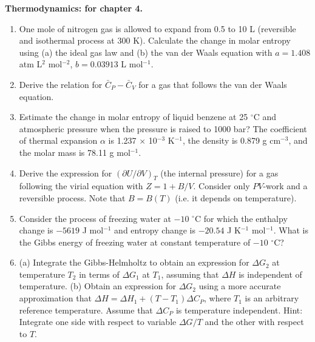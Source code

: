 \noindent
\textbf{Thermodynamics:
 for chapter 4.}\\

\begin{enumerate}

\item One mole of nitrogen gas is allowed to expand from 0.5 to 10 L (reversible and isothermal process at 300 K). Calculate the change in molar entropy using (a) the ideal
gas law and (b) the van der Waals equation with $a = 1.408$ atm L$^2$ mol$^{-2}$, $b = 0.03913$ L mol$^{-1}$.


\item Derive the relation for $\bar{C}_P - \bar{C}_V$ for a gas that follows the van der Waals equation.


\item Estimate the change in molar entropy of liquid benzene at 25 $^\circ$C and atmospheric pressure when the pressure is raised to 1000 bar? The coefficient of thermal expansion $\alpha$ is 1.237 $\times$ 10$^{-3}$ K$^{-1}$, the density is 0.879 g cm$^{-3}$, and the molar mass is 78.11 g mol$^{-1}$.


\item Derive the expression for $\left(\partial U / \partial V\right)_T$ (the internal pressure) for a gas following the virial equation with $Z = 1 + B / V$. Consider only $PV$-work and a reversible process. Note that $B = B(T)$ (i.e. it depends on temperature).


\item Consider the process of freezing water at $-10$ $^\circ$C for which the enthalpy change is $-5619$ J mol$^{-1}$ and entropy change is $-20.54$ J K$^{-1}$ mol$^{-1}$. What is the Gibbs energy of freezing water at constant temperature of $-10$ $^\circ$C?


\item (a) Integrate the Gibbs-Helmholtz to obtain an expression for $\Delta G_2$ at temperature $T_2$ in terms of $\Delta G_1$ at $T_1$, assuming that $\Delta H$ is independent of temperature. (b) Obtain an expression for $\Delta G_2$ using a more accurate approximation that $\Delta H = \Delta H_1 + (T - T_1)\Delta C_P$, where $T_1$ is an arbitrary reference temperature. Assume that $\Delta C_P$ is temperature independent. Hint: Integrate one side with respect to variable $\Delta G / T$ and the other with respect to $T$.


\end{enumerate}
